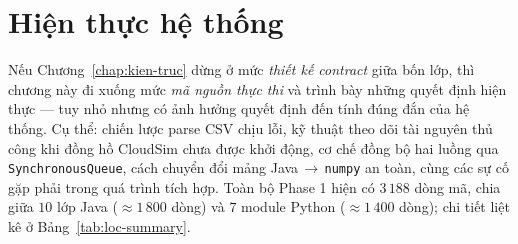 \chapter{Hiện thực hệ thống}
\label{chap:hien-thuc}

Nếu Chương~\ref{chap:kien-truc} dừng ở mức \emph{thiết kế contract}
giữa bốn lớp, thì chương này đi xuống mức \emph{mã nguồn thực thi} và
trình bày những quyết định hiện thực --- tuy nhỏ nhưng có ảnh hưởng
quyết định đến tính đúng đắn của hệ thống. Cụ thể: chiến lược parse
CSV chịu lỗi, kỹ thuật theo dõi tài nguyên thủ công khi đồng hồ
CloudSim chưa được khởi động, cơ chế đồng bộ hai luồng qua
\texttt{SynchronousQueue}, cách chuyển đổi mảng
Java\,$\to$\,\texttt{numpy} an toàn, cùng các sự cố gặp phải trong
quá trình tích hợp. Toàn bộ Phase 1 hiện có $3\,188$ dòng mã, chia
giữa $10$ lớp Java ($\approx 1\,800$ dòng) và $7$ module Python
($\approx 1\,400$ dòng); chi tiết liệt kê ở
Bảng~\ref{tab:loc-summary}.

